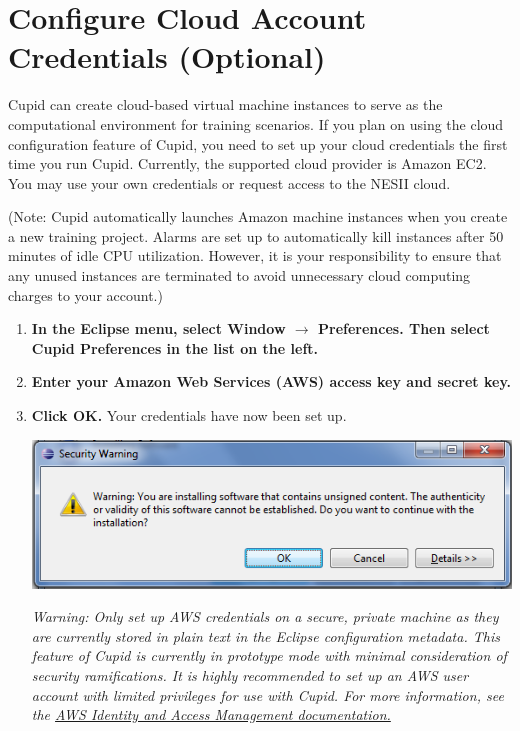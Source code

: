 \documentclass[oneside,11pt]{memoir}
\begin{document}
\section{Configure Cloud Account Credentials (Optional)}
\label{sec:cloudconfig}

Cupid can create cloud-based virtual machine instances to serve as the computational environment for training scenarios. If you plan on using the cloud configuration feature of Cupid, you need to set up your cloud credentials the first time you run Cupid. Currently, the supported cloud provider is Amazon EC2. You may use your own credentials or request access to the NESII cloud.

(Note: Cupid automatically launches Amazon machine instances when you create a new training project.  Alarms are set up to automatically kill instances after 50 minutes of idle CPU utilization. However, it is your responsibility to ensure that any unused instances are terminated to avoid unnecessary cloud computing charges to your account.)

\begin{enumerate}
\item \textbf{In the Eclipse menu, select Window $\rightarrow$ Preferences. Then select Cupid Preferences in the list on the left.}
\item \textbf{Enter your Amazon Web Services (AWS) access key and secret key.}
\item \textbf{Click OK.}  Your credentials have now been set up.  

\parbox{\linewidth}{\centering
  \includegraphics{figs/install_fig5.png}
}

\emph{Warning:  Only set up AWS credentials on a secure, private machine as they are currently stored in plain text in the Eclipse configuration metadata.  This feature of Cupid is currently in prototype mode with minimal consideration of security ramifications. It is highly recommended to set up an AWS user account with limited privileges for use with Cupid.  For more information, see the \href{http://docs.aws.amazon.com/IAM/latest/UserGuide/IAM_Introduction.html}{AWS Identity and Access Management documentation.}}


\end{enumerate}
\end{document}
